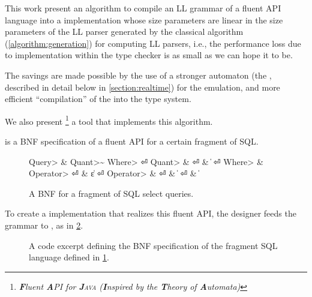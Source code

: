 This work present an algorithm to compile an LL grammar of a fluent API
language into a \Java implementation whose size parameters are linear in
the size parameters of the LL parser generated by the classical 
algorithm (\cref{algorithm:generation}) for computing LL parsers, 
i.e., the performance loss due to implementation within the \Java
type checker is as small as we can hope it to be.

The savings are made possible by the use of a stronger automaton (the \RLLp,
described in detail below in \cref{section:realtime}) for the emulation, and 
more efficient ``compilation'' of the \RLLp into the \Java type system.

We also present \Fajita\footnote{\itshape \textbf Fluent \textbf API for
  \textsc{\textbf Java} 
    (\textbf Inspired by the \textbf Theory of \textbf Automata)
  }
a \Java tool that implements this algorithm.

 is a BNF specification of a fluent API for a certain
fragment of SQL.

\begin{figure}[H]
  \caption{\label{figure:sql-bnf}
    A BNF for a fragment of SQL select queries.
  }
  \begin{Grammar}
    \begin{aligned}
      \<Query>    & \Derives {} \<Quant>\~ \<Where> \hfill⏎
      \<Quant>    & \Derives {} \hfill⏎
                  & \|  \hfill⏎
      \<Where>    & \Derives {}  \<Operator> \hfill⏎
                  & \|ε \hfill⏎
      \<Operator> & \Derives {}\hfill⏎
                  & \|  \hfill⏎
                  & \| \hfill
    \end{aligned}
  \end{Grammar}
\end{figure}

To create a \Java implementation that realizes this fluent API,
  the designer feeds the grammar to \Fajita, as in  
  \cref{figure:sql-bnf-java}.

\begin{figure}[H]
  \caption{\label{figure:sql-bnf-java}
    A \Java code excerpt defining the BNF specification of the fragment SQL
    language defined in \cref{figure:sql-bnf}.}
\end{figure}

